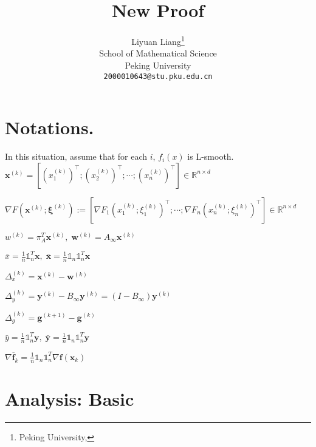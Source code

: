 \documentclass{article}
\title{New Proof}
\author{
  Liyuan Liang\thanks{Peking University, } \\
  School of Mathematical Science\\
  Peking University\\
  \texttt{2000010643@stu.pku.edu.cn} \\
}
\newcommand{\vf}{{\mathbf{f}}}
\newcommand{\vg}{{\mathbf{g}}}
\newcommand{\vw}{{\mathbf{w}}}
\newcommand{\vx}{{\mathbf{x}}}
\newcommand{\vy}{{\mathbf{y}}}
\newcommand{\bxi}{\boldsymbol{\xi}}
\newcommand{\one}{\mathds{1}_n}
\newcommand{\R}{\frac{1}{n}\mathds{1}_n \mathds{1}_n^T}
\begin{document}
\maketitle
\tableofcontents 
\newpage


\section{Notations.}
In this situation, assume that for each $i$, $f_i(x)$ is L-smooth.\\
$\vx^{(k)} = [(x_1^{(k)})^\top; (x_2^{(k)})^\top; \cdots; (x_n^{(k)})^\top]\in \mathbb{R}^{n\times d}$

$\nabla F(\vx^{(k)};\bxi^{(k)}) := [\nabla F_1(x_1^{(k)};\xi_1^{(k)})^\top; \cdots; \nabla F_n(x_n^{(k)};\xi_n^{(k)})^\top]\in \mathbb{R}^{n\times d}\nonumber$

$w^{(k)}=\pi_A^T\vx^{(k)},\;\vw^{(k)}=A_\infty \vx^{(k)}$

$\bar{x}=\frac{1}{n} \one^T \vx,\; \mathbf{\bar{x}}=\R\vx$

$\Delta_x^{(k)}=\vx^{(k)}-\vw^{(k)}$

$\Delta_y^{(k)}=\vy^{(k)}-B_{\infty}\vy^{(k)}=(I-B_\infty)\vy^{(k)}$

$\Delta_{g}^{(k)}=\vg^{(k+1)}-\vg^{(k)}$

$\bar{y}=\frac{1}{n} \one^T \vy,\; \mathbf{\bar{y}}=\R\vy$

$\nabla\overline{\vf}_k=\frac{1}{n}\mathds{1}_n\mathds{1}_n^T\nabla \vf(\vx_k)$

\section{Analysis: Basic}
\end{document}
